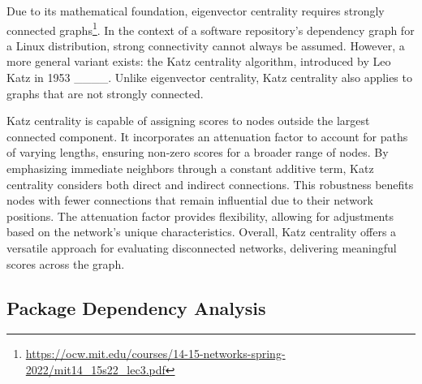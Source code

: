 Due to its mathematical foundation, eigenvector centrality requires strongly connected graphs\footnote{\url{https://ocw.mit.edu/courses/14-15-networks-spring-2022/mit14_15s22_lec3.pdf}}.
In the context of a software repository's dependency graph for a Linux distribution, strong connectivity cannot always be assumed.
However, a more general variant exists: the Katz centrality algorithm, introduced by Leo Katz in 1953 ____.
Unlike eigenvector centrality, Katz centrality also applies to graphs that are not strongly connected.


Katz centrality is capable of assigning scores to nodes outside the largest connected component.
It incorporates an attenuation factor to account for paths of varying lengths, ensuring non-zero scores for a broader range of nodes.
By emphasizing immediate neighbors through a constant additive term, Katz centrality considers both direct and indirect connections.
This robustness benefits nodes with fewer connections that remain influential due to their network positions.
The attenuation factor provides flexibility, allowing for adjustments based on the network's unique characteristics.
Overall, Katz centrality offers a versatile approach for evaluating disconnected networks, delivering meaningful scores across the graph.

\subsection{Package Dependency Analysis}


